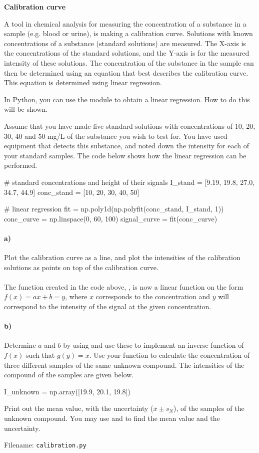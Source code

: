 \newpage
\begin{Problem}{\textbf{Calibration curve}}

\noindent
A tool in chemical analysis for measuring the concentration of a substance in a sample (e.g. blood or urine), is making a calibration curve. Solutions with known concentrations of a substance (standard solutions) are measured. The X-axis is the concentrations of the standard solutions, and the Y-axis is for the measured intensity of these solutions. The concentration of the substance in the sample can then be determined using an equation that best describes the calibration curve. This equation is determined using linear regression. 

In Python, you can use the  module to obtain a linear regression. How to do this will be shown.

Assume that you have made five standard solutions with concentrations of 10, 20, 30, 40 and 50 mg/L of the substance you wish to test for. You have used equipment that detects this substance, and noted down the intensity for each of your standard samples. The code below shows how the linear regression can be performed.
\begin{python}
# standard concentrations and height of their signals
I_stand = [9.19, 19.8, 27.0, 34.7, 44.9]
conc_stand = [10, 20, 30, 40, 50]

# linear regression
fit = np.poly1d(np.polyfit(conc_stand, I_stand, 1))
conc_curve = np.linspace(0, 60, 100)
signal_curve = fit(conc_curve)
\end{python}

\paragraph{a)} 
Plot the calibration curve as a line, and plot the intensities of the calibration solutions as points on top of the calibration curve. 

\paragraph{}
\noindent
The function created in the code above, , is now a linear function on the form $f(x) = a x + b = y$, where $x$ corresponds to the concentration and $y$ will correspond to the intensity of the signal at the given concentration.

\paragraph{b)} 
Determine $a$ and $b$ by using  and use these to implement an inverse function of $f(x)$ such that $g(y) = x$. Use your function to calculate the concentration of three different samples of the same unknown compound. The intensities of the compound of the samples are given below.
\begin{python}
I_unknown = np.array([19.9, 20.1, 19.8])
\end{python}
Print out the mean value, with the uncertainty ($\overline{x} \pm s_N$), of the samples of the unknown compound. You may use  and  to find the mean value and the uncertainty.

Filename: \texttt{calibration.py}
\end{Problem}